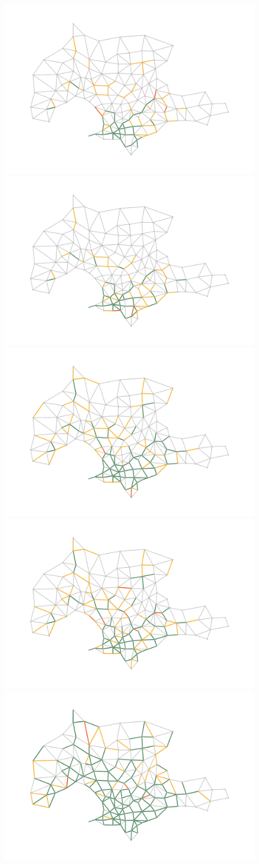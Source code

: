 \begin{figure}[h!]
  \centering
  \includegraphics[width=.49\linewidth]{../resources/montevideo_d3000.0_linear_0.4_budget_factor.png}
  \includegraphics[width=.49\linewidth]{../resources/montevideo_d3000.0_inv_logit_0.4_budget_factor.png}
  \includegraphics[width=.49\linewidth]{../resources/montevideo_d3000.0_linear_0.8_budget_factor.png}
  \includegraphics[width=.49\linewidth]{../resources/montevideo_d3000.0_inv_logit_0.8_budget_factor.png}
  \includegraphics[width=.49\linewidth]{../resources/montevideo_d3000.0_linear_1.6_budget_factor.png}

\end{figure}
